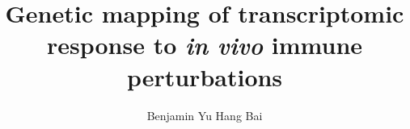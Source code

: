 \documentclass[english,11pt,a4paper,twoside,openright]{book}
\begin{document}

\title{Genetic mapping of transcriptomic response to \textit{in vivo} immune perturbations}
\author{Benjamin Yu Hang Bai}
\date{\DTMnow}

%
%
\frontmatter
%
%

% 

% 


%
%
\mainmatter
 


% 


%
% 

%
%
\backmatter



\end{document}
